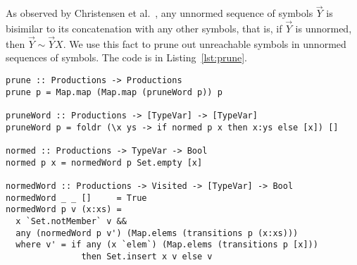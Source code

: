 
As observed by Christensen et
al.~\cite{DBLP:journals/iandc/ChristensenHS95}, any unnormed sequence
of symbols $\vec Y$ is bisimilar to its concatenation with any other
symbols, that is, if $\vec Y$ is unnormed, then
$\vec Y \sim \vec YX$.
%
%
We use this fact
to prune out unreachable symbols in unnormed sequences of symbols. The
code is in Listing~\ref{lst:prune}. 

\begin{lstlisting}[caption={Haskell code for the stage 2: pruning unnormed productions},label={lst:prune},captionpos=b]
prune :: Productions -> Productions
prune p = Map.map (Map.map (pruneWord p)) p

pruneWord :: Productions -> [TypeVar] -> [TypeVar]
pruneWord p = foldr (\x ys -> if normed p x then x:ys else [x]) []

normed :: Productions -> TypeVar -> Bool
normed p x = normedWord p Set.empty [x]

normedWord :: Productions -> Visited -> [TypeVar] -> Bool
normedWord _ _ []     = True
normedWord p v (x:xs) =
  x `Set.notMember` v &&
  any (normedWord p v') (Map.elems (transitions p (x:xs)))
  where v' = if any (x `elem`) (Map.elems (transitions p [x]))
               then Set.insert x v else v
\end{lstlisting}

